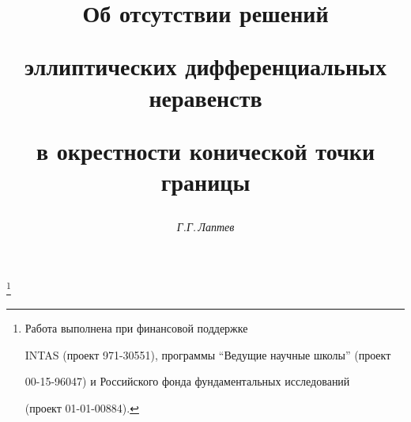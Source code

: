 









\newcommand{\eps}{\varepsilon}


\newcommand{\p}{\partial}


\renewcommand{\(}{\left(}


\renewcommand{\)}{\right)}


\newcommand{\loc}{\operatorname{loc}}


\newcommand{\supp}{\operatorname{supp}}


\newcommand{\R}{\Bbb R}


\newcommand{\tts}[1]{}










\setcounter{page}{50}















\author{\it Г.Г.\,Лаптев}




\title{Об отсутствии решений


эллиптических дифференциальных неравенств


в окрестности конической точки границы}


\thanks{Работа выполнена при финансовой поддержке


INTAS (проект 971-30551), программы ``Ведущие научные школы'' (проект


00-15-96047) и Российского фонда фундаментальных исследований


(проект 01-01-00884).}





